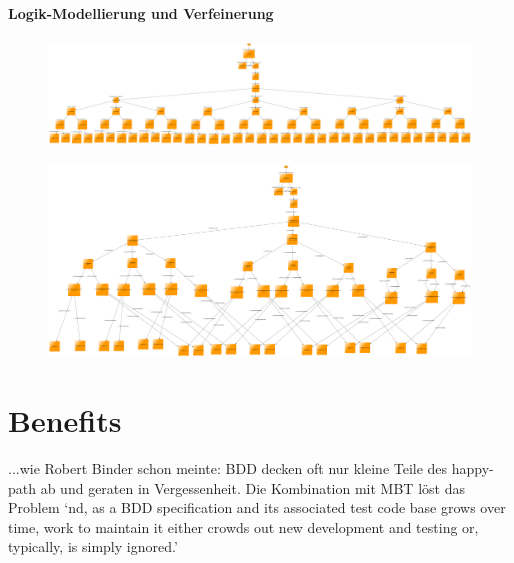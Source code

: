 \paragraph{Logik-Modellierung und Verfeinerung}


\begin{figure}[h] 
  \centering
     \includegraphics[width=1.5\textwidth, angle=90]{figures/modell_komplex.png}
  \caption{}
  \label{fig:modell_abstract}
\end{figure}


\begin{figure}[h] 
  \centering
     \includegraphics[width=1.5\textwidth, angle=90]{figures/modell_logisch.png}
  \caption{}
  \label{fig:modell_abstract}
\end{figure}

\section{Benefits}
...wie Robert Binder\cite{binder_model-based_2014} schon meinte: BDD decken oft nur kleine Teile des happy-path ab und geraten in Vergessenheit. Die Kombination mit MBT löst das Problem `nd, as a BDD specification and its associated test code base grows over time, work to maintain it either crowds out new development and testing or, typically, is simply ignored.'














